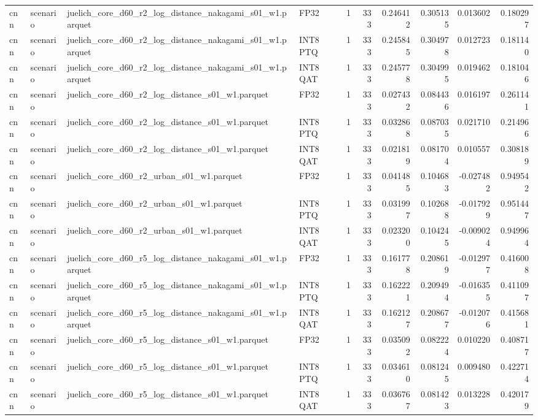 \begin{tabular}{llllrrrrrr}
cnn & scenario & juelich\_core\_d60\_r2\_log\_distance\_nakagami\_s01\_w1.parquet & FP32 & 1 & 333 & 0.246412 & 0.305135 & 0.013602 & 0.180297 \\
cnn & scenario & juelich\_core\_d60\_r2\_log\_distance\_nakagami\_s01\_w1.parquet & INT8 PTQ & 1 & 333 & 0.245845 & 0.304978 & 0.012723 & 0.181140 \\
cnn & scenario & juelich\_core\_d60\_r2\_log\_distance\_nakagami\_s01\_w1.parquet & INT8 QAT & 1 & 333 & 0.245778 & 0.304995 & 0.019462 & 0.181046 \\
cnn & scenario & juelich\_core\_d60\_r2\_log\_distance\_s01\_w1.parquet & FP32 & 1 & 333 & 0.027432 & 0.084436 & 0.016197 & 0.261141 \\
cnn & scenario & juelich\_core\_d60\_r2\_log\_distance\_s01\_w1.parquet & INT8 PTQ & 1 & 333 & 0.032868 & 0.087035 & 0.021710 & 0.214966 \\
cnn & scenario & juelich\_core\_d60\_r2\_log\_distance\_s01\_w1.parquet & INT8 QAT & 1 & 333 & 0.021819 & 0.081704 & 0.010557 & 0.308189 \\
cnn & scenario & juelich\_core\_d60\_r2\_urban\_s01\_w1.parquet & FP32 & 1 & 333 & 0.041485 & 0.104683 & -0.027482 & 0.949542 \\
cnn & scenario & juelich\_core\_d60\_r2\_urban\_s01\_w1.parquet & INT8 PTQ & 1 & 333 & 0.031997 & 0.102688 & -0.017929 & 0.951447 \\
cnn & scenario & juelich\_core\_d60\_r2\_urban\_s01\_w1.parquet & INT8 QAT & 1 & 333 & 0.023200 & 0.104245 & -0.009024 & 0.949964 \\
cnn & scenario & juelich\_core\_d60\_r5\_log\_distance\_nakagami\_s01\_w1.parquet & FP32 & 1 & 333 & 0.161778 & 0.208619 & -0.012977 & 0.416008 \\
cnn & scenario & juelich\_core\_d60\_r5\_log\_distance\_nakagami\_s01\_w1.parquet & INT8 PTQ & 1 & 333 & 0.162221 & 0.209494 & -0.016355 & 0.411097 \\
cnn & scenario & juelich\_core\_d60\_r5\_log\_distance\_nakagami\_s01\_w1.parquet & INT8 QAT & 1 & 333 & 0.162127 & 0.208677 & -0.012076 & 0.415681 \\
cnn & scenario & juelich\_core\_d60\_r5\_log\_distance\_s01\_w1.parquet & FP32 & 1 & 333 & 0.035092 & 0.082224 & 0.010220 & 0.408717 \\
cnn & scenario & juelich\_core\_d60\_r5\_log\_distance\_s01\_w1.parquet & INT8 PTQ & 1 & 333 & 0.034610 & 0.081245 & 0.009480 & 0.422714 \\
cnn & scenario & juelich\_core\_d60\_r5\_log\_distance\_s01\_w1.parquet & INT8 QAT & 1 & 333 & 0.036767 & 0.081423 & 0.013228 & 0.420179 \\

\end{tabular}
